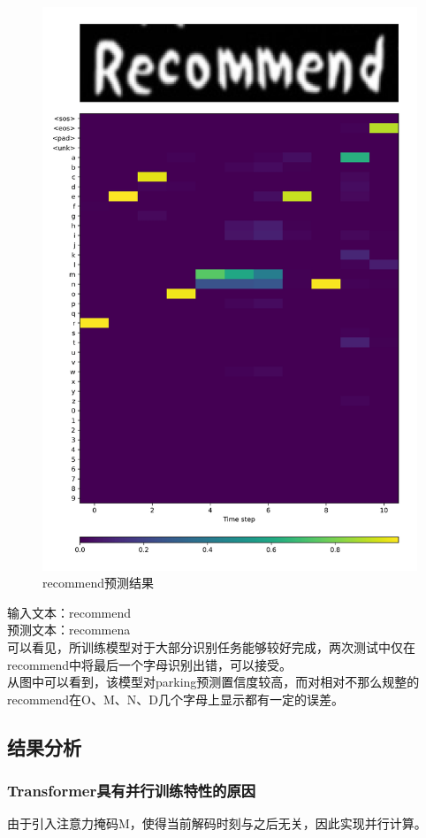 \documentclass[a4paper]{article}
\begin{document}
\begin{figure}
    \centering
    \includegraphics[width=12cm]{recommend_vis.jpg}
    \caption{recommend预测结果}
\end{figure}
输入文本：recommend \\
预测文本：recommena \\

可以看见，所训练模型对于大部分识别任务能够较好完成，两次测试中仅在recommend中将最后一个字母识别出错，可以接受。\\
从图中可以看到，该模型对parking预测置信度较高，而对相对不那么规整的recommend在O、M、N、D几个字母上显示都有一定的误差。\\

\subsection{结果分析}
\subsubsection{Transformer具有并行训练特性的原因}
由于引入注意力掩码M，使得当前解码时刻与之后无关，因此实现并行计算。\\
\end{document}
